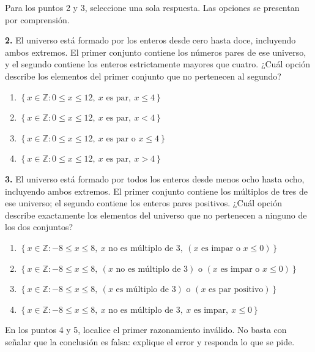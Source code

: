 \documentclass[11pt,a4paper]{article}
\newcommand{\Set}[1]{\left\{#1\right\}}
\begin{document}
\noindent Para los puntos 2 y 3, seleccione una sola respuesta. Las opciones se presentan por comprensión.

\noindent\textbf{2.} El universo está formado por los enteros desde cero hasta doce, incluyendo ambos extremos. El primer conjunto contiene los números pares de ese universo, y el segundo contiene los enteros estrictamente mayores que cuatro. ¿Cuál opción describe los elementos del primer conjunto que no pertenecen al segundo?

\begin{enumerate}[label=\Alph*), leftmargin=1.2cm, itemsep=0.45em]
    \item $\Set{x\in\mathbb{Z}:0\leq x\leq12,\ x\text{ es par},\ x\leq4}$
    \item $\Set{x\in\mathbb{Z}:0\leq x\leq12,\ x\text{ es par},\ x<4}$
    \item $\Set{x\in\mathbb{Z}:0\leq x\leq12,\ x\text{ es par o }x\leq4}$
    \item $\Set{x\in\mathbb{Z}:0\leq x\leq12,\ x\text{ es par},\ x>4}$
\end{enumerate}

\noindent\textbf{3.} El universo está formado por todos los enteros desde menos ocho hasta ocho, incluyendo ambos extremos. El primer conjunto contiene los múltiplos de tres de ese universo; el segundo contiene los enteros pares positivos. ¿Cuál opción describe exactamente los elementos del universo que no pertenecen a ninguno de los dos conjuntos?

\begin{enumerate}[label=\Alph*), leftmargin=1.2cm, itemsep=0.45em]
    \item $\Set{x\in\mathbb{Z}:-8\leq x\leq8,\ x\text{ no es múltiplo de }3,\ (x\text{ es impar o }x\leq0)}$
    \item $\Set{x\in\mathbb{Z}:-8\leq x\leq8,\ (x\text{ no es múltiplo de }3)\text{ o }(x\text{ es impar o }x\leq0)}$
    \item $\Set{x\in\mathbb{Z}:-8\leq x\leq8,\ (x\text{ es múltiplo de }3)\text{ o }(x\text{ es par positivo})}$
    \item $\Set{x\in\mathbb{Z}:-8\leq x\leq8,\ x\text{ no es múltiplo de }3,\ x\text{ es impar},\ x\leq0}$
\end{enumerate}


\noindent En los puntos 4 y 5, localice el primer razonamiento inválido. No basta con señalar que la conclusión es falsa: explique el error y responda lo que se pide.
\end{document}
